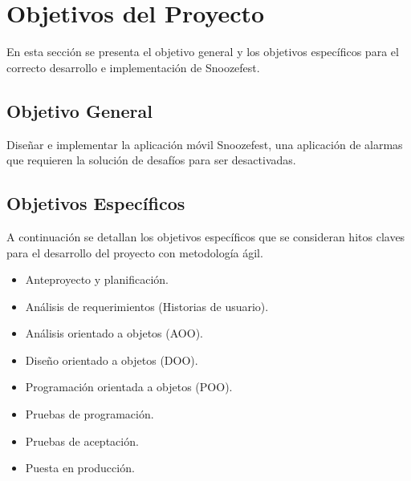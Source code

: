 \section{Objetivos del Proyecto}
En esta sección se presenta el objetivo general y los objetivos específicos para el correcto desarrollo e implementación de Snoozefest.
\subsection{Objetivo General}
Diseñar e implementar la aplicación móvil Snoozefest, una aplicación de alarmas que requieren la solución de desafíos para ser desactivadas.
\subsection{Objetivos Específicos}
A continuación se detallan los objetivos específicos que se consideran hitos claves para el desarrollo del proyecto con metodología ágil.
\begin{itemize}
	\item Anteproyecto y planificación.
	\item Análisis de requerimientos (Historias de usuario).
	\item Análisis orientado a objetos (AOO).
	\item Diseño orientado a objetos (DOO).
	\item Programación orientada a objetos (POO).
	\item Pruebas de programación.
	\item Pruebas de aceptación.
	\item Puesta en producción.
\end{itemize}
